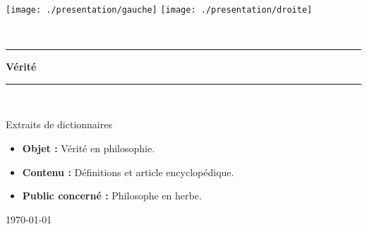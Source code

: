 \begin{titlepage}
%
\newcommand{\HRule}{\rule{\linewidth}{0.5mm}}

\begin{center}
\texttt{[image: ./presentation/gauche]}
\hspace{1cm}
\texttt{[image: ./presentation/droite]}
\end{center}

\textsc{\Large }\\[0.5cm]

\HRule

\begin{center}
{\Huge \bfseries  Vérité }
\end{center}

\HRule \\[1.5cm]


\vfill

\begin{flushright} \huge
Extraits de dictionnaires
\end{flushright}

\vfill
{\sf
\begin{itemize}[leftmargin=1cm, label=, itemsep=1pt]
\item {\bf Objet : } Vérité en philosophie.
\item {\bf Contenu : } Définitions et article encyclopédique.
\item {\bf Public concerné : } Philosophe en herbe.
\end{itemize}
}

\vfill

{\large \today}

\end{titlepage}
